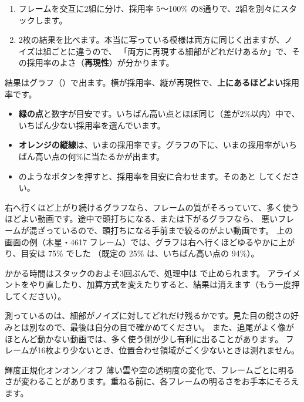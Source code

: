 \begin{enumerate}[itemsep=1pt, topsep=3pt]
  \item フレームを交互に2組に分け、採用率 5〜100\% の8通りで、2組を別々にスタックします。
  \item 2枚の結果を比べます。本当に写っている模様は両方に同じく出ますが、ノイズは組ごとに違うので、
        「両方に再現する細部がどれだけあるか」で、その採用率のよさ（\textbf{再現性}）が分かります。
\end{enumerate}

結果はグラフ（）で出ます。横が採用率、縦が再現性で、\textbf{上にあるほどよい}採用率です。

\begin{itemize}[itemsep=1pt, topsep=3pt]
  \item \textbf{緑の点}と数字が目安です。いちばん高い点とほぼ同じ（差が2\%以内）中で、いちばん少ない採用率を選んでいます。
  \item \textbf{オレンジの縦線}は、いまの採用率です。グラフの下に、いまの採用率がいちばん高い点の何\%に当たるかが出ます。
  \item {} のようなボタンを押すと、採用率を目安に合わせます。そのあと  してください。
\end{itemize}

右へ行くほど上がり続けるグラフなら、フレームの質がそろっていて、多く使うほどよい動画です。途中で頭打ちになる、または下がるグラフなら、
悪いフレームが混ざっているので、頭打ちになる手前まで絞るのがよい動画です。
上の画面の例（木星・4617 フレーム）では、グラフは右へ行くほどゆるやかに上がり、目安は 75\% でした
（既定の 25\% は、いちばん高い点の 94\%）。

かかる時間はスタックのおよそ3回ぶんで、処理中は  で止められます。
アライメントをやり直したり、加算方式を変えたりすると、結果は消えます（もう一度押してください）。

\begin{caution}
  測っているのは、細部がノイズに対してどれだけ残るかです。見た目の鋭さの好みとは別なので、最後は自分の目で確かめてください。
  また、追尾がよく像がほとんど動かない動画では、多く使う側が少し有利に出ることがあります。
  フレームが16枚より少ないとき、位置合わせ領域がごく少ないときは測れません。
\end{caution}

\begin{setting}{ 輝度正規化}{オン}{オン／オフ}
  薄い雲や空の透明度の変化で、フレームごとに明るさが変わることがあります。重ねる前に、各フレームの明るさをお手本にそろえます。
\end{setting}

